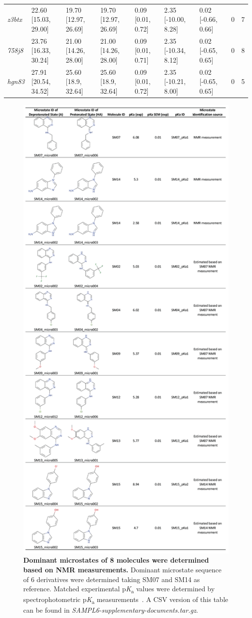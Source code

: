 \documentclass[9pt,lineno,final]{elife}
\newcommand{\pKa}{p\textit{K}\textsubscript{a}}
\begin{document}
\begin{table}[tb!]
\begin{center}
\begin{threeparttable}
\begin{tabular}{@{}lllllllll@{}}
\textit{z3btx} & 22.60 [15.03, 29.00] & 19.70 [12.97, 26.69] & 19.70 [12.97, 26.69] & 0.09 [0.01, 0.72] & 2.35 [-10.00, 8.28] & 0.02 [-0.66, 0.66] & 0 & 7 \\
\textit{758j8} & 23.76 [16.33, 30.24] & 21.00 [14.26, 28.00] & 21.00 [14.26, 28.00] & 0.09 [0.01, 0.71] & 2.35 [-10.34, 8.12] & 0.02 [-0.65, 0.65] & 0 & 8 \\
\textit{hgn83} & 27.91 [20.54, 34.52] & 25.60 [18.9, 32.64] & 25.60 [18.9, 32.64] & 0.09 [0.01, 0.72] & 2.35 [-10.21, 8.00] & 0.02 [-0.65, 0.65] & 0 & 5 \\ \bottomrule
\end{tabular}
\end{threeparttable}
\end{center}
\end{table}



\begin{figure}
\centering
\includegraphics[width=0.5\linewidth]{figures/experimental-microstates-of-8mol-based-on-NMR.png}
\caption{ {\bf Dominant microstates of 8 molecules were determined based on NMR measurements.} Dominant microstate sequence of 6 derivatives were determined taking SM07 and SM14 as reference. Matched experimental \pKa{} values were determined by spectrophotometric \pKa{} measurements~\citep{Isik:2018:J.Comput.AidedMol.Des.}. A CSV version of this table can be found in \textit{SAMPL6-supplementary-documents.tar.gz}.
}
\label{fig:experimental-microstate-IDs-SI-table}
\end{figure}
\end{document}
